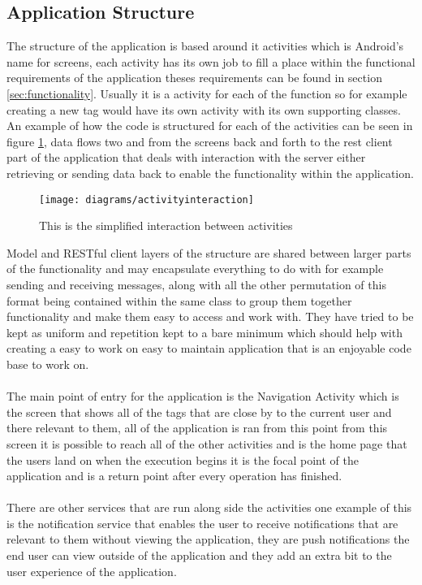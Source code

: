 \subsection{Application Structure}
\label{sec:android_application_structure}


The structure of the application is based around it activities which is Android's name for screens, each activity has its own job to fill a place within the functional requirements of the application theses requirements can be found in section \ref{sec:functionality}. Usually it is a activity for each of the function so for example creating a new tag would have its own activity with its own supporting classes. An example of how the code is structured for each of the activities can be seen in figure \ref{fig:activity_interation_image}, data flows two and from the screens back and forth to the rest client part of the application that deals with interaction with the server either retrieving or sending data back to enable the functionality within the application.\\

\begin{figure}[H]
    \centering
    \texttt{[image: diagrams/activityinteraction]}
    \caption{This is the simplified interaction between activities}
    \label{fig:activity_interation_image}
\end{figure} 

\noindent
Model and RESTful client layers of the structure are shared between larger parts of the functionality and may encapsulate everything to do with for example sending and receiving messages, along with all the other permutation of this format being contained within the same class to group them together functionality and make them easy to access and work with. They have tried to be kept as uniform and repetition kept to a bare minimum which should help with creating a easy to work on easy to maintain application that is an enjoyable code base to work on.\\
\\
The main point of entry for the application is the Navigation Activity which is the screen that shows all of the tags that are close by to the current user and there relevant to them, all of the application is ran from this point from this screen it is possible to reach all of the other activities and is the home page that the users land on when the execution begins it is the focal point of the application and is a return point after every operation has finished.\\
\\
There are other services that are run along side the activities one example of this is the notification service that enables the user to receive notifications that are relevant to them without viewing the application, they are push notifications the end user can view outside of the application and they add an extra bit to the user experience of the application.

